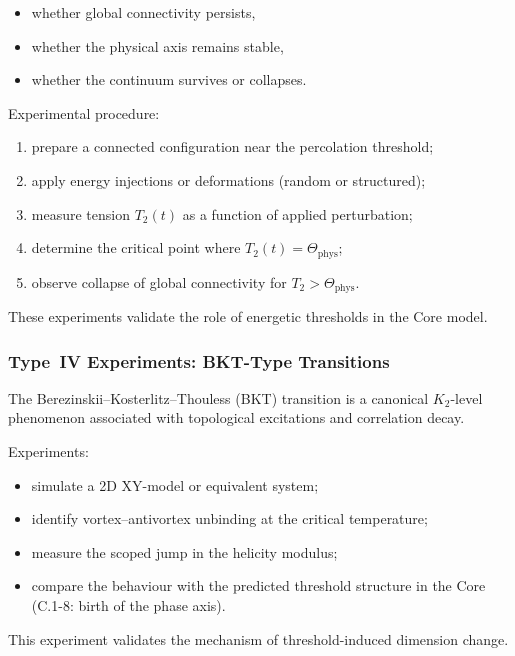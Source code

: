 \begin{itemize}
    \item whether global connectivity persists,
    \item whether the physical axis remains stable,
    \item whether the continuum survives or collapses.
\end{itemize}

Experimental procedure:

\begin{enumerate}
    \item prepare a connected configuration near the percolation threshold;
    \item apply energy injections or deformations (random or structured);
    \item measure tension $T_2(t)$ as a function of applied perturbation;
    \item determine the critical point where $T_2(t) = \Theta_{\mathrm{phys}}$;
    \item observe collapse of global connectivity for $T_2 > \Theta_{\mathrm{phys}}$.
\end{enumerate}

These experiments validate the role of energetic thresholds in the Core model.



\subsubsection{Type~IV Experiments: BKT-Type Transitions}

The Berezinskii–Kosterlitz–Thouless (BKT) transition is a canonical 
$K_2$-level phenomenon associated with topological excitations and 
correlation decay.

Experiments:

\begin{itemize}
    \item simulate a 2D XY-model or equivalent system;
    \item identify vortex–antivortex unbinding at the critical temperature;
    \item measure the scoped jump in the helicity modulus;
    \item compare the behaviour with the predicted threshold structure in 
          the Core (C.1-8: birth of the phase axis).
\end{itemize}

This experiment validates the mechanism of threshold-induced dimension change.



